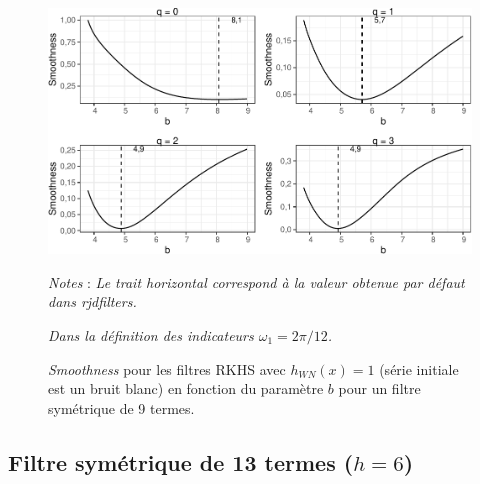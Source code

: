\documentclass[
  11pt,
  french,
  a4paper]{article}
\newcommand\1{\mathds{1}}
\begin{document}
\begin{figure}[H]

{\centering \includegraphics{img/bookdown/pdf/rkhsoptismoothness4wn-1} 

}

\caption[\emph{Smoothness} pour les filtres RKHS avec \(h_{WN}(x)=1\) (série initiale est un bruit blanc) en fonction du paramètre \(b\) pour un filtre symétrique de 9 termes]{\emph{Smoothness} pour les filtres RKHS avec \(h_{WN}(x)=1\) (série initiale est un bruit blanc) en fonction du paramètre \(b\) pour un filtre symétrique de 9 termes.}\label{fig:rkhsoptismoothness4wn}

\footnotesize


\emph{Notes} : \emph{Le trait horizontal correspond à la valeur obtenue par défaut dans rjdfilters.}

\emph{Dans la définition des indicateurs \(\omega_1=2\pi/12\).}
\normalsize\end{figure}

\newpage

\hypertarget{filtre-symuxe9trique-de-13-termes-h6}{%
\subsection{\texorpdfstring{Filtre symétrique de 13 termes (\(h=6\))}{Filtre symétrique de 13 termes (h=6)}}\label{filtre-symuxe9trique-de-13-termes-h6}}
\end{document}
